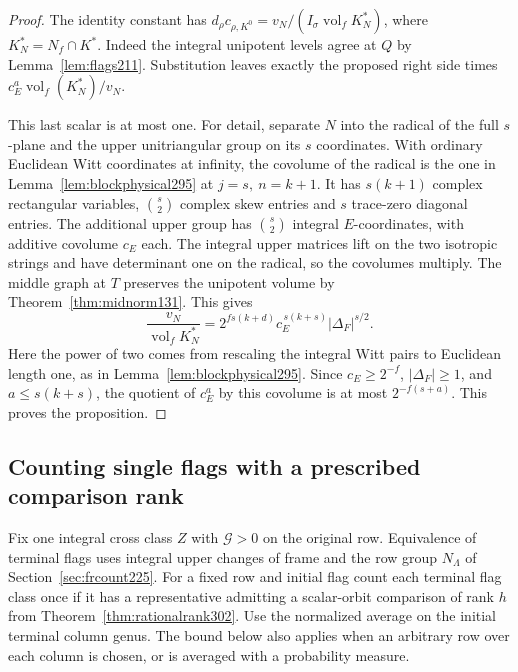 \documentclass[a4paper,11pt]{article}
\theoremstyle{definition}
\theoremstyle{remark}
\numberwithin{equation}{section}
\begin{document}
\begin{proof}
The identity constant has
\(d_\rho c_{\rho,K^0}=v_N/(I_\sigma\operatorname{vol}_f K_N^*)\),
where \(K_N^*=N_f\cap K^*\). Indeed the integral unipotent
levels agree at \(Q\) by Lemma~\ref{lem:flags211}. Substitution
leaves exactly the proposed right side times
\(c_E^a\operatorname{vol}_f(K_N^*)/v_N\).

This last scalar is at most one. For detail, separate \(N\)
into the radical of the full \(s\)-plane and the upper
unitriangular group on its \(s\) coordinates. With ordinary
Euclidean Witt coordinates at infinity, the covolume of
the radical is the one in Lemma~\ref{lem:blockphysical295}
at \(j=s,\ n=k+1\). It has \(s(k+1)\) complex rectangular
variables, \(\binom{s}{2}\) complex skew entries and \(s\)
trace-zero diagonal entries. The additional upper group
has \(\binom{s}{2}\) integral \(E\)-coordinates, with
additive covolume \(c_E\) each. The integral upper matrices
lift on the two isotropic strings and have determinant one
on the radical, so the covolumes multiply. The middle graph
at \(T\) preserves the unipotent volume by
Theorem~\ref{thm:midnorm131}. This gives
\[
   \frac{v_N}{\operatorname{vol}_f K_N^*}
     =2^{fs(k+d)}c_E^{\,s(k+s)}|\Delta_F|^{s/2}.
\]
Here the power of two comes from rescaling the integral
Witt pairs to Euclidean length one, as in
Lemma~\ref{lem:blockphysical295}. Since \(c_E\ge2^{-f}\),
\(|\Delta_F|\ge1\), and \(a\le s(k+s)\), the quotient
of \(c_E^a\) by this covolume is at most \(2^{-f(s+a)}\).
This proves the proposition.
\end{proof}

\subsection{Counting single flags with a prescribed comparison rank}\label{nav:VI-58}
Fix one integral cross class \(Z\) with \(\mathcal G>0\)
on the original row. Equivalence of terminal flags uses
integral upper changes of frame and the row group
\(N_\Lambda\) of Section~\ref{sec:frcount225}. For a fixed
row and initial flag count each terminal flag class once
if it has a representative admitting a scalar-orbit
comparison of rank \(h\) from Theorem~\ref{thm:rationalrank302}.
Use the normalized average on the initial terminal column
genus. The bound below also applies when an arbitrary row
over each column is chosen, or is averaged with a probability
measure.
\end{document}
